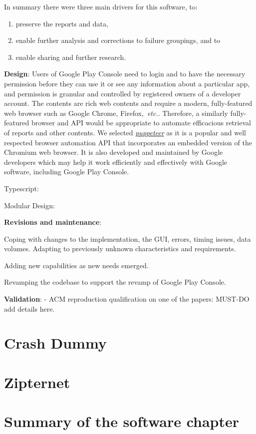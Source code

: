 In summary there were three main drivers for this software, to:
\begin{enumerate}
    \item preserve the reports and data,
    \item enable further analysis and corrections to failure groupings, and to
    \item enable sharing and further research.
\end{enumerate}

\textbf{Design}:
Users of Google Play Console need to login and to have the necessary permission before they can use it or see any information about a particular app, and permission is granular and controlled by registered owners of a developer account. The contents are rich web contents and require a modern, fully-featured web browser such as Google Chrome, Firefox,~\emph{etc.}. Therefore, a similarly fully-featured browser and API would be appropriate to automate efficacious retrieval of reports and other contents. We selected \href{https://developers.google.com/web/tools/puppeteer}{\emph{puppeteer}} as it is a popular and well respected browser automation API that incorporates an embedded version of the Chromium web browser. It is also developed and maintained by Google developers which may help it work efficiently and effectively with Google software, including Google Play Console.

Typescript:

Modular Design:

\textbf{Revisions and maintenance}:

Coping with changes to the implementation, the GUI, errors, timing issues, data volumes. Adapting to previously unknown characteristics and requirements. 

Adding new capabilities as new needs emerged.

Revamping the codebase to support the revamp of Google Play Console.

\textbf{Validation}:
- ACM reproduction qualification on one of the papers: MUST-DO add details here. 

\section{Crash Dummy}


\section{Zipternet}


\section{Summary of the software chapter}